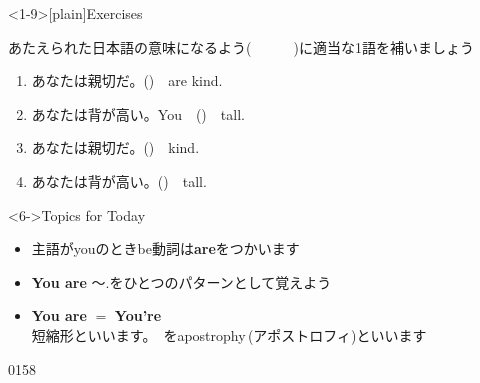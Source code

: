\documentclass[aspectratio=169,xcolor={dvipsnames,table}]{beamer}
\begin{document}
\begin{frame}<1-9>[plain]{Exercises}

{\small あたえられた日本語の意味になるよう(~~~~~~)に適当な1語を補いましょう}

\begin{enumerate}
 \item {\small あなたは親切だ}。()~~are kind.
 \item {\small あなたは背が高い。}You~~()~~tall.
 \item {\small あなたは親切だ。}()~~kind.
 \item {\small あなたは背が高い。}()~~tall.
\end{enumerate}

 \begin{block}<6->{Topics for Today}\small
{}
\begin{itemize}[square]
 \item<6,9> 主語がyouのときbe動詞は\textbf{are}をつかいます
 \item<7,9> \textbf{You are} 〜.をひとつのパターンとして覚えよう
 \item<8-> \textbf{You are} $=$ \textbf{You're} \\
\mbox{}\hfill{}{\scriptsize {}短縮形といいます。 \,をapostrophy\,(アポストロフィ)といいます\phantom{あ}}
\end{itemize}
     \end{block}

\hfill{\tiny 0158}\,{\scriptsize {}}



\end{frame}
%
%
%
%
\end{document}

